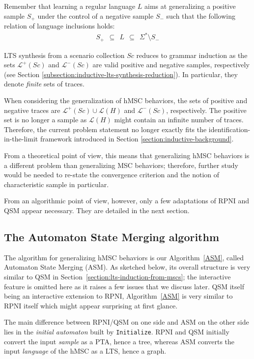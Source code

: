 Remember that learning a regular language $L$ aims at generalizing a positive sample $S_+$ under the control of a negative sample $S_-$ such that the following relation of language inclusions holds:
\begin{align}
S_+~~\subseteq~~L~~\subseteq~~\Sigma^*\setminus S_-
\end{align}

LTS synthesis from a scenario collection $Sc$ reduces to grammar induction as the sets $\mathcal{L}^+(Sc)$ and $\mathcal{L}^-(Sc)$ are valid positive and negative samples, respectively (see Section \ref{subsection:inductive-lts-synthesis-reduction}). In particular, they denote \emph{finite} sets of traces.

When considering the generalization of hMSC behaviors, the sets of positive and negative traces are $\mathcal{L}^+(Sc) \cup \mathcal{L}(H)$ and $\mathcal{L}^-(Sc)$, respectively. The positive set is no longer a sample as $\mathcal{L}(H)$ might contain an infinite number of traces. Therefore, the current problem statement no longer exactly fits the identification-in-the-limit framework introduced in Section \ref{section:inductive-background}. 

From a theoretical point of view, this means that generalizing hMSC behaviors is a different problem than generalizing MSC behaviors; therefore, further study would be needed to re-state the convergence criterion and the notion of characteristic sample in particular. 

From an algorithmic point of view, however, only a few adaptations of RPNI and QSM appear necessary. They are detailed in the next section.

\subsection{The Automaton State Merging algorithm\label{subsection:automaton-state-merging}}

The algorithm for generalizing hMSC behaviors is our Algorithm~\ref{ASM}, called Automaton State Merging (ASM). As sketched below, its overall structure is very similar to QSM in Section~\ref{section:lts-induction-from-mscs}; the interactive feature is omitted here as it raises a few issues that we discuss later. QSM itself being an interactive extension to RPNI, Algorithm~\ref{ASM} is very similar to RPNI itself which might appear surprising at first glance.

The main difference between RPNI/QSM on one side and ASM on the other side lies in the \emph{initial automaton} built by \texttt{Initialize}. RPNI and QSM initially convert the input \emph{sample} as a PTA, hence a tree, whereas ASM converts the input \emph{language} of the hMSC as a LTS, hence a graph. 

